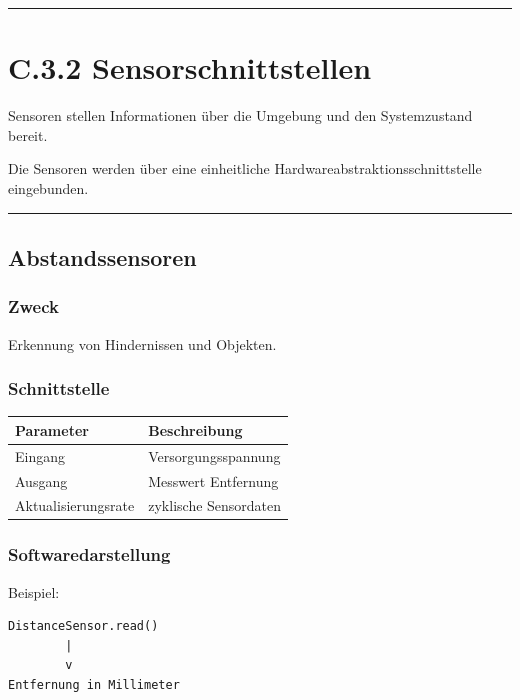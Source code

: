 \documentclass[
  a4paper,
  12pt,
  DIV=12,        %
  parskip=half,  %
  headings=small %
]{scrartcl}
\theoremstyle{definition}
\theoremstyle{definition}
\begin{document}
\begin{center}\rule{0.5\linewidth}{0.5pt}\end{center}

\section{C.3.2 Sensorschnittstellen}\label{c.3.2-sensorschnittstellen}

Sensoren stellen Informationen über die Umgebung und den Systemzustand
bereit.

Die Sensoren werden über eine einheitliche
Hardwareabstraktionsschnittstelle eingebunden.

\begin{center}\rule{0.5\linewidth}{0.5pt}\end{center}

\subsection{Abstandssensoren}\label{abstandssensoren-1}

\subsubsection{Zweck}\label{zweck}

Erkennung von Hindernissen und Objekten.

\subsubsection{Schnittstelle}\label{schnittstelle}

\begin{longtable}[]{@{}ll@{}}
\toprule\noalign{}
Parameter & Beschreibung \\
\midrule\noalign{}
\endhead
\bottomrule\noalign{}
\endlastfoot
Eingang & Versorgungsspannung \\
Ausgang & Messwert Entfernung \\
Aktualisierungsrate & zyklische Sensordaten \\
\end{longtable}

\subsubsection{Softwaredarstellung}\label{softwaredarstellung}

Beispiel:

\begin{verbatim}
DistanceSensor.read()
        |
        v
Entfernung in Millimeter
\end{verbatim}
\end{document}

